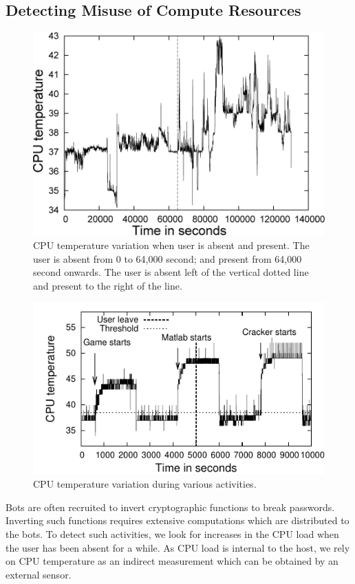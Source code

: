 \subsection{Detecting Misuse of Compute Resources} \label{subsec:passwordcrack}

\begin{figure}[tb]
\centering
\includegraphics[width=0.8\columnwidth]{sensor/normal-cat.png}
\caption{CPU temperature variation when user is absent and present. 
The user is absent from 0 to 64,000 second;
and present from 64,000 second onwards. The user is absent left of
the vertical dotted line and present to the right of the line.
} 
\label{fig:temp-norm}
\end{figure}


\begin{figure}[tb]
\centering
\includegraphics[width=1.0\columnwidth]{sensor/temp-activities.pdf}
\caption{CPU temperature variation during various
activities. } \label{fig:temp-activities}
\end{figure}

Bots are often recruited to invert cryptographic functions to break
passwords. Inverting such functions requires extensive computations
which are distributed to the bots. To detect such activities, we
look for increases in the CPU load when the user has been absent for a
while. As CPU load is internal to the host,
we rely on CPU temperature as an indirect measurement which can
be obtained by an external sensor.

